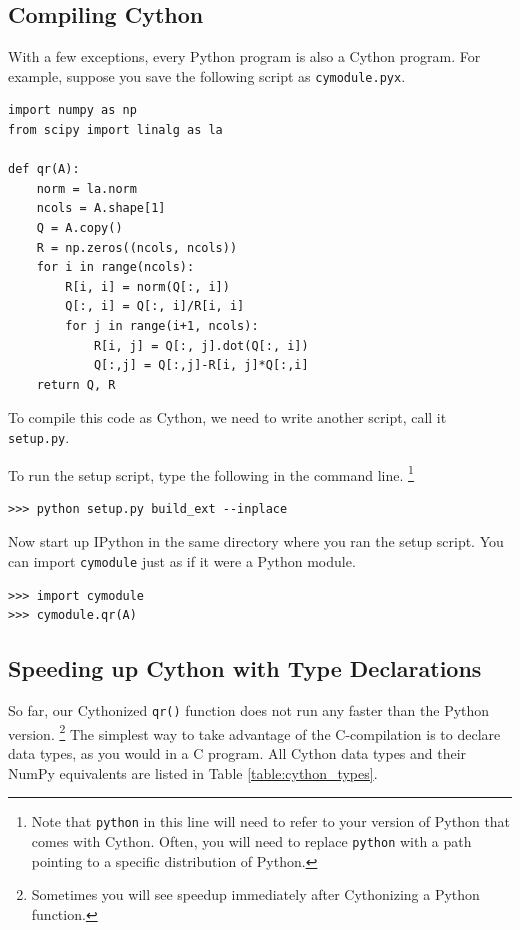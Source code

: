 \subsection*{Compiling Cython}
With a few exceptions, every Python program is also a Cython program.
For example, suppose you save the following script as \texttt{cymodule.pyx}.
\begin{lstlisting}
import numpy as np
from scipy import linalg as la

def qr(A):
    norm = la.norm
    ncols = A.shape[1]
    Q = A.copy()
    R = np.zeros((ncols, ncols))
    for i in range(ncols):
        R[i, i] = norm(Q[:, i])
        Q[:, i] = Q[:, i]/R[i, i]
        for j in range(i+1, ncols):
            R[i, j] = Q[:, j].dot(Q[:, i])
            Q[:,j] = Q[:,j]-R[i, j]*Q[:,i]
    return Q, R
\end{lstlisting}
To compile this code as Cython, we need to write another script, call it \texttt{setup.py}.

To run the setup script, type the following in the command line.
\footnote{Note that \texttt{python} in this line will need to refer to your version of Python that comes with Cython. 
Often, you will need to replace \texttt{python} with a path pointing to a specific distribution of Python.}
\begin{lstlisting}
>>> python setup.py build_ext --inplace
\end{lstlisting}
Now start up IPython in the same directory where you ran the setup script.
You can import \texttt{cymodule} just as if it were a Python module.
\begin{lstlisting}
>>> import cymodule
>>> cymodule.qr(A)
\end{lstlisting}

\subsection*{Speeding up Cython with Type Declarations}
So far, our Cythonized \texttt{qr()} function does not run any faster than the Python version.
\footnote{Sometimes you will see speedup immediately after Cythonizing a Python function.}
The simplest way to take advantage of the C-compilation is to declare data types, as you would in a C program.
All Cython data types and their NumPy equivalents are listed in Table \ref{table:cython_types}.

